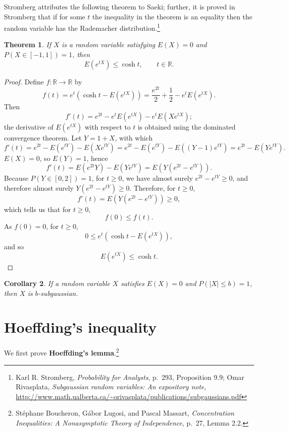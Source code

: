 \documentclass{article}
\newtheorem{theorem}{Theorem}
\newtheorem{corollary}[theorem]{Corollary}
\theoremstyle{definition}
\begin{document}
Stromberg attributes the following theorem to Saeki;
further, it is proved in Stromberg that if for some $t$ the inequality in the theorem is an equality then
the random variable has the Rademacher distribution.\footnote{Karl  R. Stromberg,
{\em Probability for Analysts}, p.~293, Proposition 9.9;
Omar Rivasplata, {\em Subgaussian random variables:
An expository note},
\url{http://www.math.ualberta.ca/~orivasplata/publications/subgaussians.pdf}}

\begin{theorem}
If $X$ is a random variable satisfying $E(X)=0$ and $P(X \in [-1,1])=1$, then
\[
E(e^{tX}) \leq \cosh t, \qquad t \in \mathbb{R}.
\]
\end{theorem}
\begin{proof}
Define $f:\mathbb{R} \to \mathbb{R}$ by
\[
f(t)  =e^t \left(\cosh t - E(e^{tX})\right) = \frac{e^{2t}}{2} + \frac{1}{2} - e^t  E(e^{tX}).
\]
Then
\[
f'(t) = e^{2t} - e^t E(e^{tX})  - e^t E(Xe^{tX});
\]
the derivative of $E(e^{tX})$ with respect to $t$ is obtained using the dominated convergence theorem.
Let  $Y=1+X$, with which
\[
f'(t) = e^{2t} -E(e^{tY}) - E(Xe^{tY})
=e^{2t}-E(e^{tY}) - E((Y-1)e^{tY})
=e^{2t}-E(Ye^{tY}).
\]
$E(X)=0$, so $E(Y)=1$, hence
\[
f'(t) = E(e^{2t}Y)-E(Ye^{tY})=E(Y(e^{2t}-e^{tY})).
\]
Because $P(Y \in [0,2])=1$, for $t \geq 0$, we have almost surely $e^{2t}-e^{tY} \geq 0$, and therefore almost surely
$Y(e^{2t}-e^{tY}) \geq 0$. 
Therefore, for $t \geq 0$,
\[
f'(t)=E(Y(e^{2t}-e^{tY})) \geq 0,
\]
which tells us that for $t \geq 0$,
\[
f(0) \leq f(t).
\]
As $f(0)=0$,  for $t \geq 0$,
\[
0 \leq e^t \left(\cosh t - E(e^{tX})\right),
\]
and so
\[
E(e^{tX}) \leq \cosh t.
\]
\end{proof}

\begin{corollary}
If a random variable $X$ satisfies $E(X)=0$ and
$P(|X| \leq b)=1$, then $X$ is $b$-subgaussian.
\end{corollary}


\section{Hoeffding's inequality}
We first prove \textbf{Hoeffding's lemma}.\footnote{St\'ephane Boucheron, G\'abor Lugosi, and
Pascal Massart, {\em Concentration Inequalities: A Nonasymptotic Theory of Independence}, p.~27, Lemma 2.2.}
\end{document}
